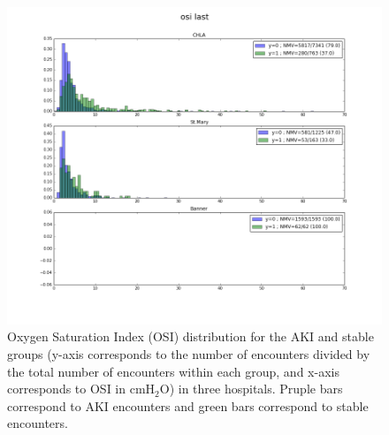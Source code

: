 \documentclass[
   technote
]{phildoc}
\begin{document}


\begin{figure}[!htbp]
\centering
\includegraphics[width=\textwidth]{./figures/osi_last.png}
\caption{Oxygen Saturation Index (OSI) distribution for the AKI and stable groups (y-axis corresponds to the number of encounters divided by the total number of encounters within each group, and x-axis corresponds to OSI in $\text{cmH}_2\text{O}$) in three hospitals. Pruple bars correspond to AKI encounters and green bars correspond to stable encounters.} 
\label{fig:osi_dist}      
\end{figure}
\end{document}
